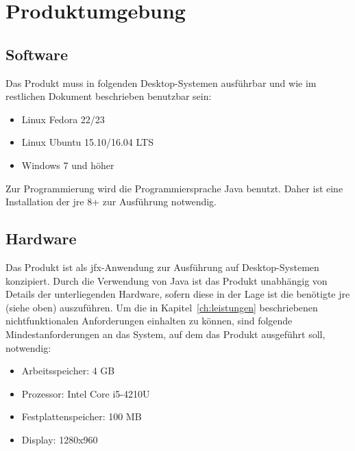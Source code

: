 \chapter{Produktumgebung}
\label{ch:umgebung}

\section{Software}
Das Produkt muss in folgenden Desktop-Systemen ausführbar und wie im restlichen Dokument beschrieben benutzbar sein:
\begin{itemize}
  \setlength\itemsep{0em}
  \item Linux Fedora 22/23 %
  \item Linux Ubuntu 15.10/16.04 LTS
  \item Windows 7 und höher
\end{itemize}
Zur Programmierung wird die Programmiersprache Java benutzt. Daher ist eine Installation der \gls{jre} 8+ zur Ausführung notwendig.

\section{Hardware}
Das Produkt ist als \gls{jfx}-Anwendung zur Ausführung auf Desktop-Systemen konzipiert.
Durch die Verwendung von Java ist das Produkt unabhängig von Details der unterliegenden Hardware, sofern diese in der Lage ist die benötigte \gls{jre} (siehe oben) auszuführen.
Um die in Kapitel~\ref{ch:leistungen} beschriebenen nichtfunktionalen Anforderungen einhalten zu können, sind folgende Mindestanforderungen an das System, auf dem das Produkt ausgeführt soll, notwendig:

\begin{itemize}
  \setlength\itemsep{0em}
  \item Arbeitsspeicher: 4 GB
  \item Prozessor: Intel Core i5-4210U %
  \item Festplattenspeicher: 100 MB
  \item Display: 1280x960
\end{itemize}
